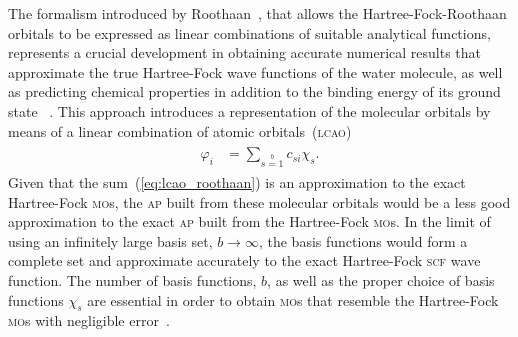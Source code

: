 The formalism introduced by Roothaan~\cite{Roothaan_HF}, that allows
the Hartree-Fock-Roothaan orbitals to be expressed as linear
combinations of suitable analytical functions, represents a crucial
development in obtaining accurate numerical results that approximate
the true Hartree-Fock wave functions of the water molecule, as well as
predicting chemical properties in addition to the binding energy of
its ground state
~\cite{scf_lc_1967,EllisonShullh2o_1955,Neumann_gaussian_1968,Pitzer_1970,Pitzer_1972}.
This approach introduces a representation of the molecular orbitals by
means of a linear combination of atomic
orbitals~(\textsc{lcao})~\cite{Roothaan_HF}
%
\begin{eqnarray}
  \begin{split}
    \varphi_{i} & = \sum\limits_{s=1}\limits^{b} c_{si} \chi_{s}.
  \end{split}
  \label{eq:lcao_roothaan}
\end{eqnarray}
%
Given that the sum~(\ref{eq:lcao_roothaan}) is an approximation to the
exact Hartree-Fock \textsc{mo}s, the \textsc{ap} built from these
molecular orbitals would be a less good approximation to the exact
\textsc{ap} built from the Hartree-Fock \textsc{mo}s. In the limit of
using an infinitely large basis set, $b\to\infty$, the basis functions
would form a complete set and approximate accurately to the exact
Hartree-Fock \textsc{scf} wave function. The number of basis
functions, $b$, as well as the proper choice of basis functions
$\chi_{s}$ are essential in order to obtain \textsc{mo}s that resemble
the Hartree-Fock \textsc{mo}s with negligible
error~\cite{Moccia_JCP_2164,Moccia_JCP_2176,Moccia_1964}.


